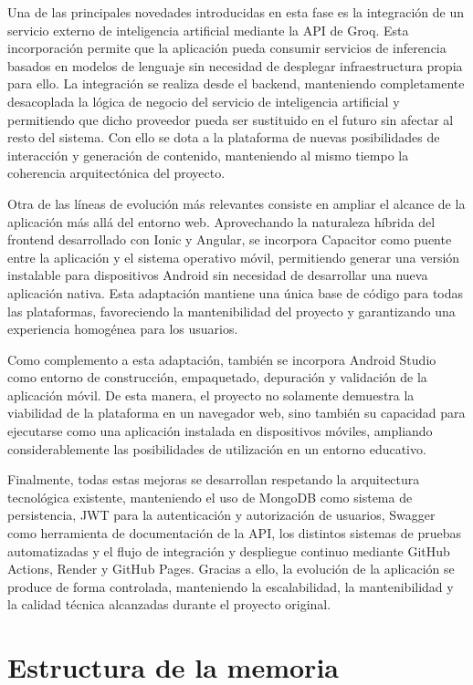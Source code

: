 Una de las principales novedades introducidas en esta fase es la integración de un servicio externo de inteligencia artificial mediante la API de Groq. Esta incorporación permite que la aplicación pueda consumir servicios de inferencia basados en modelos de lenguaje sin necesidad de desplegar infraestructura propia para ello. La integración se realiza desde el backend, manteniendo completamente desacoplada la lógica de negocio del servicio de inteligencia artificial y permitiendo que dicho proveedor pueda ser sustituido en el futuro sin afectar al resto del sistema. Con ello se dota a la plataforma de nuevas posibilidades de interacción y generación de contenido, manteniendo al mismo tiempo la coherencia arquitectónica del proyecto.

Otra de las líneas de evolución más relevantes consiste en ampliar el alcance de la aplicación más allá del entorno web. Aprovechando la naturaleza híbrida del frontend desarrollado con Ionic y Angular, se incorpora Capacitor como puente entre la aplicación y el sistema operativo móvil, permitiendo generar una versión instalable para dispositivos Android sin necesidad de desarrollar una nueva aplicación nativa. Esta adaptación mantiene una única base de código para todas las plataformas, favoreciendo la mantenibilidad del proyecto y garantizando una experiencia homogénea para los usuarios.

Como complemento a esta adaptación, también se incorpora Android Studio como entorno de construcción, empaquetado, depuración y validación de la aplicación móvil. De esta manera, el proyecto no solamente demuestra la viabilidad de la plataforma en un navegador web, sino también su capacidad para ejecutarse como una aplicación instalada en dispositivos móviles, ampliando considerablemente las posibilidades de utilización en un entorno educativo.

Finalmente, todas estas mejoras se desarrollan respetando la arquitectura tecnológica existente, manteniendo el uso de MongoDB como sistema de persistencia, JWT para la autenticación y autorización de usuarios, Swagger como herramienta de documentación de la API, los distintos sistemas de pruebas automatizadas y el flujo de integración y despliegue continuo mediante GitHub Actions, Render y GitHub Pages. Gracias a ello, la evolución de la aplicación se produce de forma controlada, manteniendo la escalabilidad, la mantenibilidad y la calidad técnica alcanzadas durante el proyecto original.
\section{Estructura de la memoria}

